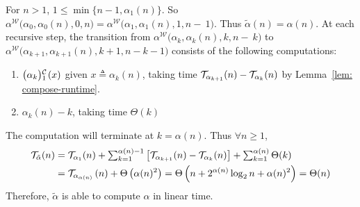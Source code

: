For $n > 1$, $1\le \min\big\{n-1, \alpha_1(n)\big\}$. So
$\alpha^{\mathcal{W}}\big(\alpha_0, \alpha_0(n), 0, n\big) =
\alpha^{\mathcal{W}}\big(\alpha_1, \alpha_1(n), 1, n-~1\big)$.
Thus $\tilde{\alpha}(n) = \alpha(n)$. At each recursive step, the transition from $\alpha^{\mathcal{W}}\big(\alpha_k, \alpha_k(n), k, n-~k\big)$ to $\alpha^{\mathcal{W}}\big(\alpha_{k+1}, \alpha_{k+1}(n), k+1, n-k-1\big)$ consists of the following computations:
 \begin{enumerate} %
	\item $\cdt{\big(\alpha_k\big)}{1}(x)$ given $x\triangleq \alpha_k(n)$, taking time $\mathcal{T}_{\alpha_{k+1}}(n) - \mathcal{T}_{\alpha_k}(n)$ by Lemma~\ref{lem: compose-runtime}.
	\item $\alpha_k(n) - k$, taking time $\Theta(k)$
\end{enumerate}
The computation will terminate at $k = \alpha(n)$. Thus $\forall n\ge 1$,
\begin{equation} \label{eq: inv-ack-runtime-improved}
\begin{aligned}
\mathcal{T}_{\tilde{\alpha}}(n)
& = \textstyle \mathcal{T}_{\alpha_1}(n) + \sum_{k=1}^{\alpha(n) - 1}
\left[ \mathcal{T}_{\alpha_{k+1}}(n) - \mathcal{T}_{\alpha_k}(n)
\right] + \sum_{k=1}^{\alpha(n)}\Theta(k) \\
& = \mathcal{T}_{\alpha_{\alpha(n)}}\left(n\right) + \Theta\left(\alpha(n)^2\right)
= \Theta\left(n + 2^{\alpha(n)}\log_2n + \alpha(n)^2\right) = \Theta(n)
\end{aligned}
\end{equation}
Therefore, $\tilde{\alpha}$ is able to compute $\alpha$ in linear time.
